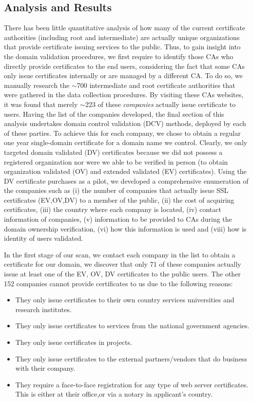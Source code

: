 \subsection{Analysis and Results}

There has been little quantitative analysis of how many of the current certificate authorities (including root and intermediate) are actually unique organizations that provide certificate issuing services to the public. Thus, to gain insight into the domain validation procedures, we first require to identify those CAs who directly provide certificates to the end users, considering the fact that some CAs only issue certificates internally or are managed by a different CA. To do so, we manually research the ${\sim}$700 intermediate and root certificate authorities that were gathered in the data collection procedures. By visiting these CAs websites, it was found that merely ${\sim}$223 of these \emph{companies} actually issue certificate to users. Having the list of the companies developed, the final section of this analysis undertakes domain control validation (DCV) methods, deployed by each of these parties. To achieve this for each company, we chose to obtain a regular one year single-domain certificate for a domain name we control. Clearly, we only targeted domain validated (DV) certificates because we did not possess a registered organization nor were we able to be verified in person (to obtain organization validated (OV) and extended validated (EV) certificates). Using the DV certificate purchases as a pilot, we developed a comprehensive enumeration of the companies such as (i) the number of companies that actually issue SSL certificates (EV,OV,DV) to a member of the public, (ii) the cost of acquiring certificates, (iii) the country where each company is located, (iv) contact information of companies, (v) information to be provided to CAs during the domain ownership verification, (vi) how this information is used and (viii) how is identity of users validated.


In the first stage of our scan, we contact each company in the list to obtain a certificate for our domain, we discover that only 71 of these companies actually issue at least one of the EV, OV, DV certificates to the public users. The other 152 companies cannot provide certificates to us due to the following reasons:
\begin{itemize}
\item They only issue certificates to their own country services \eg universities and research institutes.
\item They only issue certificates to services from the national government agencies.
\item They only issue certificates in projects.
\item They only issue certificates to the external partners/vendors that do business with their company.
\item They require a face-to-face registration for any type of web server certificates. This is either at their office,or via a notary in applicant’s country.
\end{itemize}

